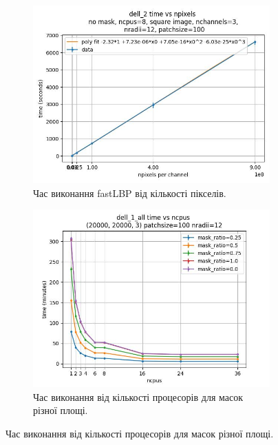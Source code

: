 \begin{figure}[h]
    \begin{subfigure}{0.45\textwidth}
    \includegraphics[width=0.99\linewidth]{img/fastlbp/complexity-time_npixels_nc3.jpg}
    \caption{
        Час виконання fastLBP від кількості пікселів.
    }
    \label{subfig:time-vs-npixels}
    \end{subfigure}%
    \begin{subfigure}{0.45\textwidth}
    \includegraphics[width=0.99\linewidth]{img/fastlbp/time_ncpus.jpg} 
    \caption{
        Час виконання від кількості процесорів для масок різної площі.
    }
    \label{subfig:parallell-efficiency-a}
    \end{subfigure}


\end{figure}
